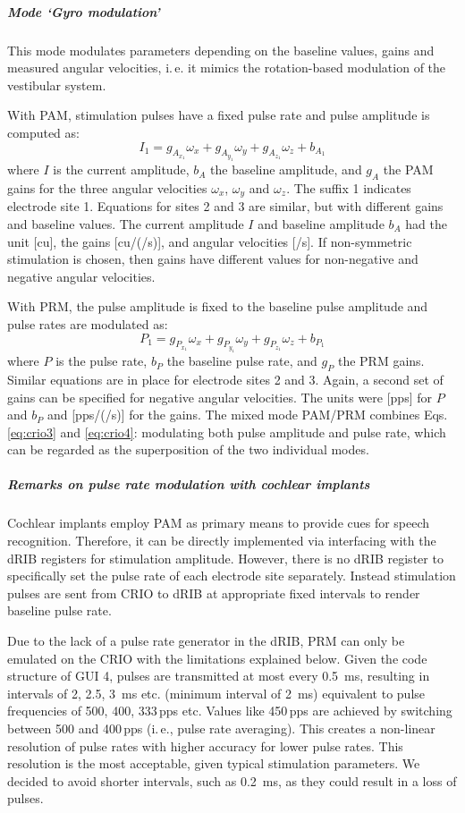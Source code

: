 \subparagraph{Mode ‘Gyro modulation’}
This mode modulates parameters depending on the baseline values, gains and measured angular velocities, i.\,e. it mimics the rotation-based modulation of the vestibular system.

With PAM, stimulation pulses have a fixed pulse rate and pulse amplitude is computed as:
\begin{equation}\label{eq:crio3}
I_1 = g_{A_{x_1}}\omega_x + g_{A_{y_1}}\omega_y + g_{A_{z_1}}\omega_z + b_{A_1}
\end{equation}
where $I$ is the current amplitude, $b_A$ the baseline amplitude, and $g_A$ the PAM gains for the three angular velocities $\omega_x$, $\omega_y$ and $\omega_z$. The suffix 1 indicates electrode site 1. Equations for sites 2 and 3 are similar, but with different gains and baseline values. The current amplitude $I$ and baseline amplitude $b_A$ had the unit [cu], the gains [cu/(\degree /s)], and angular velocities [\degree /s]. If non-symmetric stimulation is chosen, then gains have different values for non-negative and negative angular velocities. 

	With PRM, the pulse amplitude is fixed to the baseline pulse amplitude and pulse rates are modulated as:
\begin{equation}\label{eq:crio4}
P_1 = g_{P_{x_1}}\omega_x + g_{P_{y_1}}\omega_y + g_{P_{z_1}}\omega_z + b_{P_1}
\end{equation}
where $P$ is the pulse rate, $b_P$ the baseline pulse rate, and $g_P$ the PRM gains. Similar equations are in place for electrode sites 2 and 3. Again, a second set of gains can be specified for negative angular velocities. The units were [pps] for $P$ and $b_P$ and [pps/(\degree /s)] for the gains.
	The mixed mode PAM/PRM combines Eqs.\,\eqref{eq:crio3} and \eqref{eq:crio4}: modulating both pulse amplitude and pulse rate, which can be regarded as the superposition of the two individual modes.
	
\subparagraph{Remarks on pulse rate modulation with cochlear implants}
Cochlear implants employ PAM as primary means to provide cues for speech recognition. Therefore, it can be directly implemented via interfacing with the dRIB registers for stimulation amplitude. However, there is no dRIB register to specifically set the pulse rate of each electrode site separately. Instead stimulation pulses are sent from CRIO to dRIB at appropriate fixed intervals to render baseline pulse rate.

	Due to the lack of a pulse rate generator in the dRIB, PRM can only be emulated on the CRIO with the limitations explained below. Given the code structure of GUI 4, pulses are transmitted at most every \SI{0.5}{\milli\second}, resulting in intervals of 2, 2.5, \SI{3}{\milli\second} etc. (minimum interval of \SI{2}{\milli\second}) equivalent to pulse frequencies of 500, 400, 333\,pps etc. Values like 450\,pps are achieved by switching between 500 and 400\,pps (i.\,e., pulse rate averaging). This creates a non-linear resolution of pulse rates with higher accuracy for lower pulse rates. This resolution is the most acceptable, given typical stimulation parameters. We decided to avoid shorter intervals, such as \SI{0.2}{\milli\second}, as they could result in a loss of pulses.

